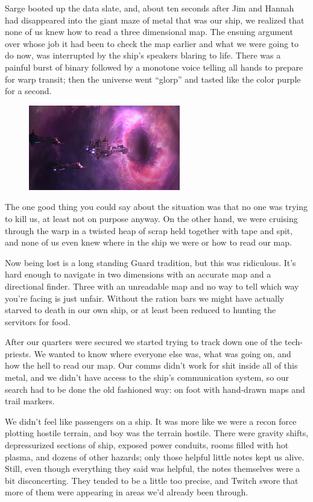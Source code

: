 Sarge booted up the data slate, and, about ten seconds after Jim and Hannah had disappeared into the giant maze of metal that was our ship, we realized that none of us knew how to read a three dimensional map. 
The ensuing argument over whose job it had been to check the map earlier and what we were going to do now, was interrupted by the ship’s speakers blaring to life. 
There was a painful burst of binary followed by a monotone voice telling all hands to prepare for warp transit; 
then the universe went “glorp” and tasted like the color purple for a second.

\begin{figure}
	\begin{center}
		\includegraphics[width=\figwidth]{pics/7/12.png}
	\end{center}
\end{figure}
The one good thing you could say about the situation was that no one was trying to kill us, at least not on purpose anyway. 
On the other hand, we were cruising through the warp in a twisted heap of scrap held together with tape and spit, and none of us even knew where in the ship we were or how to read our map.

Now being lost is a long standing Guard tradition, but this was ridiculous. 
It’s hard enough to navigate in two dimensions with an accurate map and a directional finder. 
Three with an unreadable map and no way to tell which way you’re facing is just unfair. 
Without the ration bars we might have actually starved to death in our own ship, or at least been reduced to hunting the servitors for food.

After our quarters were secured we started trying to track down one of the tech-priests. 
We wanted to know where everyone else was, what was going on, and how the hell to read our map. 
Our comms didn’t work for shit inside all of this metal, and we didn’t have access to the ship’s communication system, so our search had to be done the old fashioned way: 
on foot with hand-drawn maps and trail markers. 


We didn’t feel like passengers on a ship. 
It was more like we were a recon force plotting hostile terrain, and boy was the terrain hostile. 
There were gravity shifts, depressurized sections of ship, exposed power conduits, rooms filled with hot plasma, and dozens of other hazards; 
only those helpful little notes kept us alive. 
Still, even though everything they said was helpful, the notes themselves were a bit disconcerting. 
They tended to be a little too precise, and Twitch swore that more of them were appearing in areas we’d already been through.

